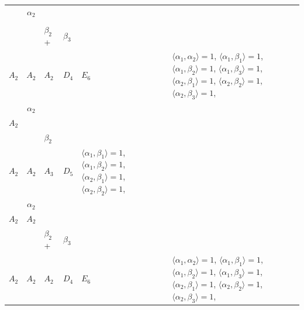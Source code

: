 \documentclass[12pt]{report}
\begin{document}
\begin{appendix}
{\begin{longtable}{rcl p{1cm}p{1cm}p{3cm} }
\\
\begin{tabular}{cc}$\alpha_1$+ & $\alpha_2$\\\tiny{  } & \tiny{  }\end{tabular} &\begin{tabular}{c} = \\~ \end{tabular} & \begin{tabular}{ccc}$\beta_1$+ & $\beta_2$+ & $\beta_3$\\\tiny{ $A_2$ } & \tiny{ $A_2$ } & \tiny{ $A_2$ }\end{tabular} & $D_4$ & $E_6$ & $\langle\alpha_1, \alpha_2\rangle=1$,  $\langle\alpha_1, \beta_1\rangle=1$, $\langle\alpha_1, \beta_2\rangle=1$, $\langle\alpha_1, \beta_3\rangle=1$, $\langle\alpha_2, \beta_1\rangle=1$, $\langle\alpha_2, \beta_2\rangle=1$, $\langle\alpha_2, \beta_3\rangle=1$, 
\\
\begin{tabular}{cc}$\alpha_1$+ & $\alpha_2$\\\tiny{ $A_2$ } & \tiny{  }\end{tabular} &\begin{tabular}{c} = \\~ \end{tabular} & \begin{tabular}{cc}$\beta_1$+ & $\beta_2$\\\tiny{ $A_2$ } & \tiny{ $A_2$ }\end{tabular} & $A_3$ & $D_5$ &  $\langle\alpha_1, \beta_1\rangle=1$, $\langle\alpha_1, \beta_2\rangle=1$, $\langle\alpha_2, \beta_1\rangle=1$, $\langle\alpha_2, \beta_2\rangle=1$, 
\\
\begin{tabular}{cc}$\alpha_1$+ & $\alpha_2$\\\tiny{ $A_2$ } & \tiny{ $A_2$ }\end{tabular} &\begin{tabular}{c} = \\~ \end{tabular} & \begin{tabular}{ccc}$\beta_1$+ & $\beta_2$+ & $\beta_3$\\\tiny{ $A_2$ } & \tiny{ $A_2$ } & \tiny{ $A_2$ }\end{tabular} & $D_4$ & $E_6$ & $\langle\alpha_1, \alpha_2\rangle=1$,  $\langle\alpha_1, \beta_1\rangle=1$, $\langle\alpha_1, \beta_2\rangle=1$, $\langle\alpha_1, \beta_3\rangle=1$, $\langle\alpha_2, \beta_1\rangle=1$, $\langle\alpha_2, \beta_2\rangle=1$, $\langle\alpha_2, \beta_3\rangle=1$, 

\end{longtable}}
\end{appendix}
\end{document}

